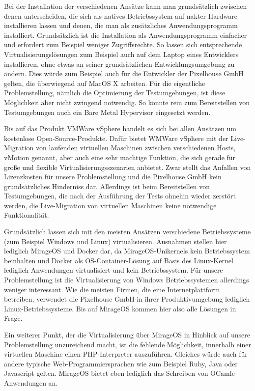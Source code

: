 Bei der Installation der verschiedenen Ansätze kann man grundsätzlich zwischen denen unterscheiden, die sich als natives Betriebssystem auf nakter Hardware installieren lassen und denen, die man als zusätzliches Anwendungsprogramm installiert. Grundsätzlich ist die Installation als Anwendungsprogramm einfacher und erfordert zum Beispiel weniger Zugriffsrechte. So lassen sich entsprechende Virtualisierungslösungen zum Beispiel auch auf dem Laptop eines Entwicklers installieren, ohne etwas an seiner grundsätzlichen Entwicklungsumgebung zu ändern. Dies würde zum Beispiel auch für die Entwickler der Pixelhouse GmbH gelten, die überwiegend auf MacOS X arbeiten. Für die eigentliche Problemstellung, nämlich die Optimierung der Testumgebungen, ist diese Möglichkeit aber nicht zwingend notwendig. So könnte rein zum Bereitstellen von Testumgebungen auch ein Bare Metal Hypervisor eingesetzt werden.

Bis auf das Produkt VMWare vSphere handelt es sich bei allen Ansätzen um kostenlose Open-Source-Produkte. Dafür bietet WMWare vSphere mit der Live-Migration von laufenden virtuellen Maschinen zwischen verschiedenen Hosts, vMotion genannt, aber auch eine sehr mächtige Funktion, die sich gerade für große und flexible Virtualisierungsszenarien anbietet. Zwar stellt das Anfallen von Lizenzkosten für unsere Problemstellung und die Pixelhouse GmbH kein grundsätzliches Hinderniss dar. Allerdings ist beim Bereitstellen von Testumgebungen, die nach der Ausführung der Tests ohnehin wieder zerstört werden, die Live-Migration von virtuellen Maschinen keine notwendige Funktionalität.

Grundsätzlich lassen sich mit den meisten Ansätzen verschiedene Betriebssysteme (zum Beispiel Windows und Linux) virtualisieren. Ausnahmen stellen hier lediglich MirageOS und Docker dar, da MirageOS-Unikernels kein Betriebssystem beinhalten und Docker als OS-Container-Lösung auf Basis des Linux-Kernel lediglich Anwendungen virtualisiert und kein Betriebssystem. Für unsere Problemstellung ist die Virtualisierung von Windows Betriebssystemen allerdings weniger interessant. Wie die meisten Firmen, die eine Internetplattform betreiben, verwendet die Pixelhouse GmbH in ihrer Produktivumgebung lediglich Linux-Betriebssysteme. Bis auf MirageOS kommen hier also alle Lösungen in Frage.

Ein weiterer Punkt, der die Virtualisierung über MirageOS in Hinblick auf unsere Problemstellung unzureichend macht, ist die fehlende Möglichkeit, innerhalb einer virtuellen Maschine einen PHP-Interpreter auszuführen. Gleiches würde auch für andere typische Web-Programmiersprachen wie zum Beispiel Ruby, Java oder Javascript gelten. MirageOS bietet eben lediglich das Schreiben von OCamle-Anwendungen an.


